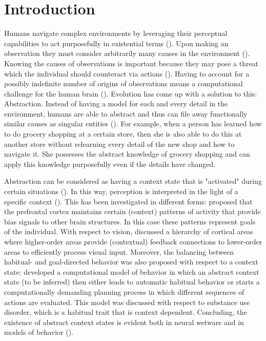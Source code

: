 \chapter{Introduction}
\label{introduction}

Humans navigate complex environments by leveraging their perceptual capabilities to act purposefully in existential terms (\cite{varela1991}). Upon making an observation they must consider arbitrarily many causes in the environment (\cite{helmholtz1867}). Knowing the causes of observations is important because they may pose a threat which the individual should counteract via actions (\cite{ashby1970}). Having to account for a possibly indefinite number of origins of observations means a computational challenge for the human brain (\cite{luby1993}). Evolution has come up with a solution to this: Abstraction. Instead of having a model for each and every detail in the environment, humans are able to abstract and thus can file away functionally similar causes as singular entities (\cite{rosch1978}). For example, when a person has learned how to do grocery shopping at a certain store, then she is also able to do this at another store without relearning every detail of the new shop and how to navigate it. She possesses the abstract knowledge of grocery shopping and can apply this knowledge purposefully even if the details have changed.

Abstraction can be considered as having a context state that is "activated" during certain situations (\cite{gershman2010}). In this way, perception is interpreted in the light of a specific context (\cite{biederman1972}). This has been investigated in different forms: \textcite{millerandcohen2001} proposed that the prefrontal cortex maintains certain (context) patterns of activity that provide bias signals to other brain structures. In this case these patterns represent goals of the individual. With respect to vision, \textcite{raoandballard1999} discussed a hierarchy of cortical areas where higher-order areas provide (contextual) feedback connections to lower-order areas to efficiently process visual input. Moreover, the balancing between habitual- and goal-directed behavior was also proposed with respect to a context state: \textcite{schwoebel2021} developed a computational model of behavior in which an abstract context state (to be inferred) then either leads to automatic habitual behavior or starts a computationally demanding planning process in which different sequences of actions are evaluated. This model was discussed with respect to substance use disorder, which is a habitual trait that is context dependent. Concluding, the existence of abstract context states is evident both in neural wetware and in models of behavior (\cite{niv2019}).

